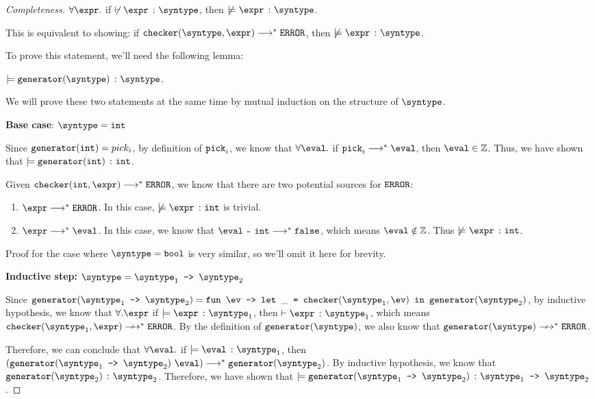 \begin{proof}[Completeness]
  $\forall \expr.$ if $\not\vdash \hastype{\expr}{\syntype}$, then $\not\models \hastype{\expr}{\syntype}$.

  This is equivalent to showing: if $\mkche{\syntype}{\expr} \smallsteps[] \eerror$, then $\not\models \hastype{\expr}{\syntype}$.

  To prove this statement, we'll need the following lemma:

  \begin{lemma}
    $\models \hastype{\mkgen{\syntype}}{\syntype}$.
  \end{lemma}

  We will prove these two statements at the same time by mutual induction on the structure of $\syntype$.

  \textbf{Base case}: $\syntype = \tint$

  Since $\texttt{generator}(\texttt{int}) = pick_i$, by definition of $\texttt{pick}_i$, we know that $\forall \eval.$ if $\pick_i \smallsteps[] \eval$, then $\eval \in \mathbb{Z}$. Thus, we have shown that $\models \texttt{generator}(\texttt{int})\ \colon \texttt{int}$.

  Given $\mkche{\tint}{\expr} \smallsteps[] \eerror$, we know that there are two potential sources for $\texttt{ERROR}$:
  \begin{enumerate}
    \item $\expr \smallsteps[] \eerror$. In this case, $\not\models \hastype{\expr}{\tint}$ is trivial. 
    \item $\expr \smallsteps[] \eval$. In this case, we know that $\matches{\eval}{\tint} \smallsteps[] \texttt{false}$, which means $\eval \notin \mathbb{Z}$. Thus $\not\models \hastype{\expr}{\tint}$. 
  \end{enumerate}

  Proof for the case where $\syntype = \tbool$ is very similar, so we'll omit it here for brevity.

  \textbf{Inductive step:} $\syntype = \mkfun{\syntype_1}{\syntype_2}$

  Since $\mkgen{\mkfun{\syntype_1}{\syntype_2}} = \mkfunv{\ev}{\letin{\_}{\mkche{\syntype_1}{\ev}}{\mkgen{\syntype_2}}}$, by inductive hypothesis, we know that $\forall.\expr$ if $\models \hastype{\expr}{\syntype_1}$, then $\vdash \hastype{\expr}{\syntype_1}$, which means $\mkche{\syntype_1}{\expr} \nsmallsteps[] \eerror$. By the definition of $\mkgen{\syntype}$, we also know that $\mkgen{\syntype} \nsmallsteps[] \eerror$.
  
  Therefore, we can conclude that $\forall \eval.$ if $\models \hastype{\eval}{\syntype_1}$, then $(\mkgen{\mkfun{\syntype_1}{\syntype_2}}\
   \eval) \smallsteps[] \mkgen{\syntype_2}$. By inductive hypothesis, we know that $\hastype{\mkgen{\syntype_2}}{\syntype_2}$. Therefore, we have shown that $\models \hastype{\mkgen{\mkfun{\syntype_1}{\syntype_2}}}{\mkfun{\syntype_1}{\syntype_2}}$.


\end{proof}
